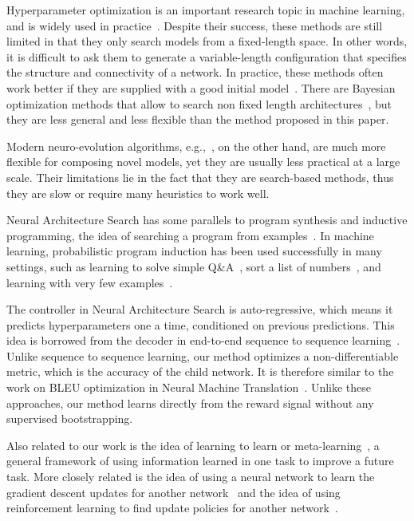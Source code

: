 \documentclass{article} \usepackage{iclr2017_conference,times}
\begin{document}
Hyperparameter optimization is an important research topic in machine learning, and is widely used in practice~\citep{bergstra2011algorithms,bergstra2012random,snoek2012practical,snoek2015scalable, saxena2016convolutional}. Despite their success, these methods are still limited in that they only search models from a fixed-length space. In other words, it is difficult to ask them to generate a variable-length configuration that specifies the structure and connectivity of a network. In practice, these methods often work better if they are supplied with a good initial model~\citep{bergstra2012random,snoek2012practical,snoek2015scalable}. There are Bayesian optimization methods that allow to search non fixed length architectures~\citep{bergstra2013making,mendoza2016towards}, but they are less general and less flexible than the method proposed in this paper.

Modern neuro-evolution algorithms, e.g.,~\cite{wierstra2005modeling,floreano2008neuroevolution,stanley2009hypercube}, on the other hand, are much more flexible for composing novel models, yet they are usually less practical at a large scale. Their limitations lie in the fact that they are search-based methods, thus they are slow or require many heuristics to work well. 

Neural Architecture Search has some parallels to program synthesis and inductive programming, the idea of searching a program from examples~\citep{summers1977methodology,biermann1978inference}. In machine learning, probabilistic program induction has been used successfully in many settings, such as learning to solve simple Q\&A~\citep{liang2010learning,neelakantan2015neural,andreas2016learning}, sort a list of numbers~\citep{reed2015neural}, and learning with very few examples~\citep{lake2015human}. 


The controller in Neural Architecture Search is auto-regressive, which means it predicts hyperparameters one a time, conditioned on previous predictions. This idea is borrowed from the decoder in end-to-end sequence to sequence learning~\citep{sutskever2014sequence}. Unlike sequence to sequence learning, our method optimizes a non-differentiable metric, which is the accuracy of the child network. It is therefore similar to the work on BLEU optimization in Neural Machine Translation~\citep{ranzato2015sequence,ShenCHHWSL15}. Unlike these approaches, our method learns directly from the reward signal without any supervised bootstrapping. 


Also related to our work is the idea of learning to learn or meta-learning~\citep{thrun2012learning}, a general framework of using information learned in one task to improve a future task. More closely related is the idea of using a neural network to learn the gradient descent updates for another network~\citep{andrychowicz2016learning} and the idea of using reinforcement learning to find update policies for another network~\citep{li2016learning}. 
\end{document}
